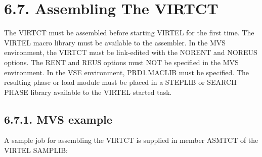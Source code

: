 \documentclass[letterpaper,10pt,english]{sphinxmanual}
\begin{document}
\begin{sphinxVerbatim}[commandchars=\\\{\}]
          
 
   
   
   
\end{sphinxVerbatim}



\section{6.7. Assembling The VIRTCT}
\label{\detokenize{Installation_Guide:id7}}
The VIRTCT must be assembled before starting VIRTEL for the first time. The VIRTEL macro library must be available to the assembler. In the MVS environment, the VIRTCT must be link-edited with the NORENT and NOREUS options. The RENT and REUS options must NOT be specified in the MVS environment. In the VSE environment, PRD1.MACLIB must be specified. The resulting phase or load module must be placed in a STEPLIB or SEARCH PHASE library available to the VIRTEL started task.


\subsection{6.7.1. MVS example}
\label{\detokenize{Installation_Guide:mvs-example}}
A sample job for assembling the VIRTCT is supplied in member ASMTCT of the VIRTEL SAMPLIB:
\end{document}
